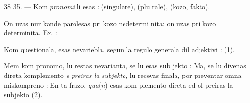 \begin{VUpage}[42]{38}
35. --- Kom \textit{pronomi} li esas :  (singulare),  (plu\cc
rale),  (kozo, fakto).

On uzas  nur kande parolesas pri kozo nedetermi\cc
nita; on uzas  pri kozo determinita. Ex. : \nl
{}

Kom  questionala,  esas nevariebla, segun la\nl
regulo generala dil adjektivi : \nl
{} (1).

Mem kom pronomo, lu restas nevarianta, se lu esas sub\cc
jekto :  Ma, se lu divenas direta komplemento \textit{e}\nl
\textit{preiras la subjekto}, lu recevas  finala, por preventar omna\nl
miskompreno :  En ta frazo, \textit{qua}(\textit{n}) esas kom\cc
plemento direta ed ol preiras la subjekto  (2).
\end{VUpage}

